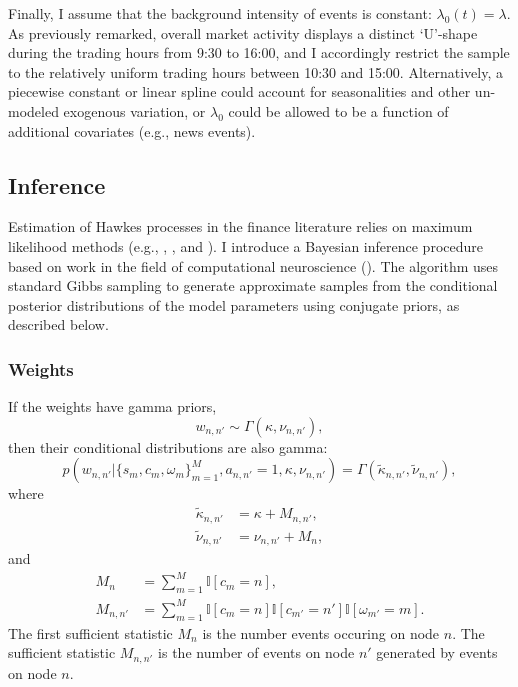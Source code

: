 		Finally, I assume that the background intensity of events is constant: $\lambda_0(t) = \lambda$. As previously remarked, overall market activity displays a distinct `U'-shape during the trading hours from 9:30 to 16:00, and I accordingly restrict the sample to the relatively uniform trading hours between 10:30 and 15:00. Alternatively, a piecewise constant or linear spline could account for seasonalities and other un-modeled exogenous variation, or $\lambda_0$ could be allowed to be a function of additional covariates (e.g., news events).

	\subsection{Inference}
		Estimation of Hawkes processes in the finance literature relies on maximum likelihood methods (e.g., \cite{Bowsher2007}, \cite{Large2007}, and \cite{Bacry2013}). I introduce a Bayesian inference procedure based on work in the field of computational neuroscience (\cite{Linderman2015}). The algorithm uses standard Gibbs sampling to generate approximate samples from the conditional posterior distributions of the model parameters using conjugate priors, as described below.

		\subsubsection*{Weights}
			If the weights have gamma priors,
			\begin{equation}
				w_{n,n'} \sim \Gamma(\kappa, \nu_{n,n'}),
			\end{equation}
			then their conditional distributions are also gamma:
			\begin{equation}
				p(w_{n,n'} | \{s_m, c_m, \omega_m\}_{m=1}^M, a_{n,n'} = 1, \kappa, \nu_{n,n'}) = \Gamma(\tilde{\kappa}_{n,n'}, \tilde{\nu}_{n,n'}),
			\end{equation}
			where
			\begin{align}
				\tilde{\kappa}_{n,n'} &= \kappa + M_{n,n'}, \\
				\tilde{\nu}_{n,n'} &= \nu_{n,n'} + M_n,
			\end{align}
			and
			\begin{align}
				M_n &= \sum_{m=1}^{M} \mathbb{I}\left[ c_m = n \right], \\
				M_{n,n'} &= \sum_{m=1}^M \mathbb{I}\left[ c_m = n \right] \mathbb{I}\left[ c_{m'} = n' \right] \mathbb{I}\left[ \omega_{m'} = m \right].
			\end{align}
			The first sufficient statistic $M_n$ is the number events occuring on node $n$. The sufficient statistic $M_{n,n'}$ is the number of events on node $n'$ generated by events on node $n$.

